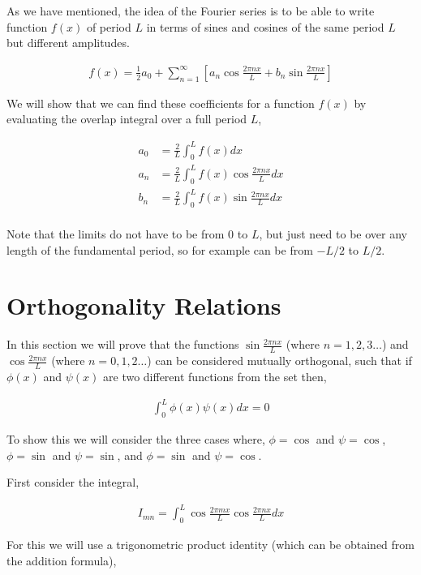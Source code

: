 \documentclass[11pt]{amsart}
\begin{document}
As we have mentioned, the idea of the Fourier series is to be able to write function $f(x)$ of period $L$ in terms of sines and cosines of the same period $L$ but different amplitudes.

\begin{align*}
  f(x) = \frac{1}{2}a_0 + \sum\limits_{n=1}^{\infty}\left[a_n\cos{\frac{2\pi nx}{L}} + b_n\sin{\frac{2\pi nx}{L}}\right]
\end{align*}

We will show that we can find these coefficients for a function $f(x)$ by evaluating the overlap integral over a full period $L$,

\begin{align*}
  a_0 &= \frac{2}{L}\int_0^L f(x) dx \\
  a_n &= \frac{2}{L}\int_0^L f(x) \cos{\frac{2\pi nx}{L}} dx \\
  b_n &= \frac{2}{L}\int_0^L f(x) \sin{\frac{2\pi nx}{L}} dx \\
\end{align*}

Note that the limits do not have to be from $0$ to $L$, but just need to be over any length of the fundamental period, so for example can be from $-L/2$ to $L/2$.


\section{Orthogonality Relations}

In this section we will prove that the functions $\sin{\frac{2\pi nx}{L}}$ (where $n = 1, 2, 3\dots$) and $\cos{\frac{2\pi nx}{L}}$ (where $n = 0, 1, 2\dots$) can be considered mutually orthogonal, such that if $\phi(x)$ and $\psi(x)$ are two different functions from the set then,

\begin{align*}
  \int_0^L\phi(x)\psi(x) dx = 0
\end{align*}

To show this we will consider the three cases where, $\phi = \cos$ and $\psi = \cos$, $\phi = \sin$ and $\psi = \sin$, and $\phi = \sin$ and $\psi = \cos$.

First consider the integral,

\begin{align*}
  I_{mn} = \int_0^L \cos{\frac{2\pi mx}{L}} \cos{\frac{2\pi nx}{L}} dx
\end{align*}

For this we will use a trigonometric product identity (which can be obtained from the addition formula),
\end{document}
